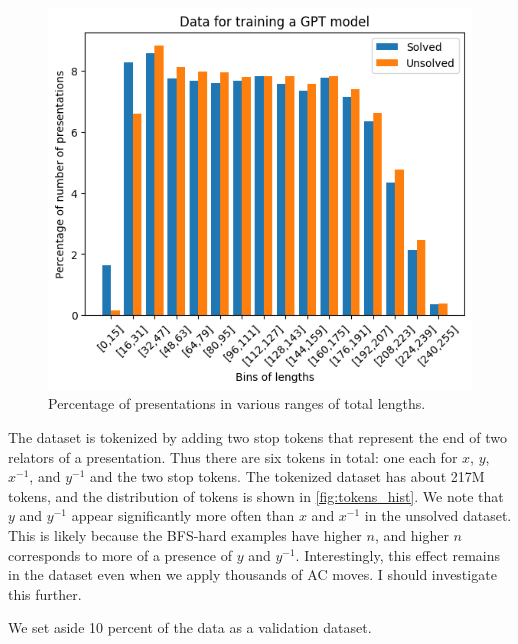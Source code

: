 \begin{figure}
	\centering
	\includegraphics[scale=0.6]{fig/gpt_data_length_distribution.png}
	\caption{Percentage of presentations in various ranges of total lengths.}
	\label{fig:gpt_data}
\end{figure}

The dataset is tokenized by adding two stop tokens that represent the end of two relators of a presentation.
Thus there are six tokens in total: one each for $x$, $y$, $x^{-1}$, and $y^{-1}$ and the two stop tokens.
The tokenized dataset has about 217M tokens, and the distribution of tokens is shown in \autoref{fig:tokens_hist}.
We note that $y$ and $y^{-1}$ appear significantly more often than $x$ and $x^{-1}$ in the unsolved dataset.
This is likely because the BFS-hard examples have higher $n$, and higher $n$ corresponds to more of a presence of $y$ and $y^{-1}$.
Interestingly, this effect remains in the dataset even when we apply thousands of AC moves.
I should investigate this further.

We set aside 10 percent of the data as a validation dataset.

